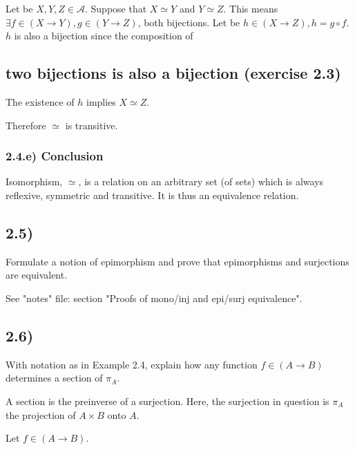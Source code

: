 \documentclass[12pt, letterpaper, twoside]{report}
\begin{document}
Let be $X, Y, Z \in \mathcal{A}$.
Suppose that $X \simeq Y$ and $Y \simeq Z$.
This means $\exists f \in (X \to Y), g \in (Y \to Z)$, both bijections.
Let be $h \in (X \to Z), h = g \circ f$. $h$ is also a bijection since the composition of \subsection*{two bijections is also a bijection (exercise 2.3)}


The existence of $h$ implies $X \simeq Z$.

Therefore $\simeq$ is transitive.


\subsubsection*{2.4.e) Conclusion}

Isomorphism, $\simeq$, is a relation on an arbitrary set (of sets) which is always reflexive, symmetric and transitive. It is thus an equivalence relation.



\subsection*{2.5)}

Formulate a notion of epimorphism and prove that epimorphisms and surjections are equivalent.

See "notes" file: section "Proofs of mono/inj and epi/surj equivalence".


\subsection*{2.6)}

With notation as in Example 2.4, explain how any function $f \in (A \to B)$ determines a section of $\pi_A$.

A section is the preinverse of a surjection. Here, the surjection in question is $\pi_A$ the projection of $A \times B$ onto $A$.

Let $f \in (A \to B)$.

\end{document}
